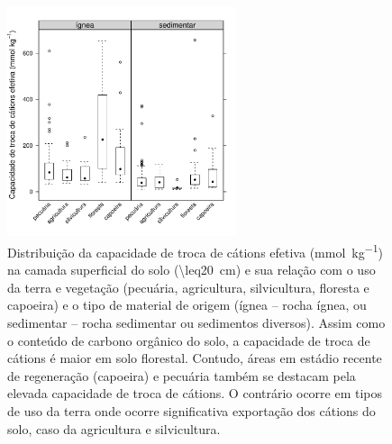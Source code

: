 \begin{figure}[!ht]
\centering
\includegraphics[width=0.60\textwidth]{fig/chap03-ecec-land-parent}
\caption[Capacidade de troca de cátions efetiva no solo e sua relação com o uso da terra e o material de 
origem do solo.]{Distribuição da capacidade de troca de cátions efetiva (\si{\milli\mole\per\kilo\gram}) na 
camada superficial do solo (\SI{\leq20}{\cm}) e sua relação com o uso da terra e vegetação (pecuária, 
agricultura, silvicultura, floresta e capoeira) e o tipo de material de origem (ígnea -- rocha ígnea, ou 
sedimentar -- rocha sedimentar ou sedimentos diversos). Assim como o conteúdo de carbono orgânico do solo, a 
capacidade de troca de cátions é maior em solo florestal. Contudo, áreas em estádio recente de regeneração 
(capoeira) e pecuária também se destacam pela elevada capacidade de troca de cátions. O contrário ocorre em 
tipos de uso da terra onde ocorre significativa exportação dos cátions do solo, caso da agricultura e 
silvicultura.}
\label{fig:chap03-ecec-land-parent}
\end{figure}

